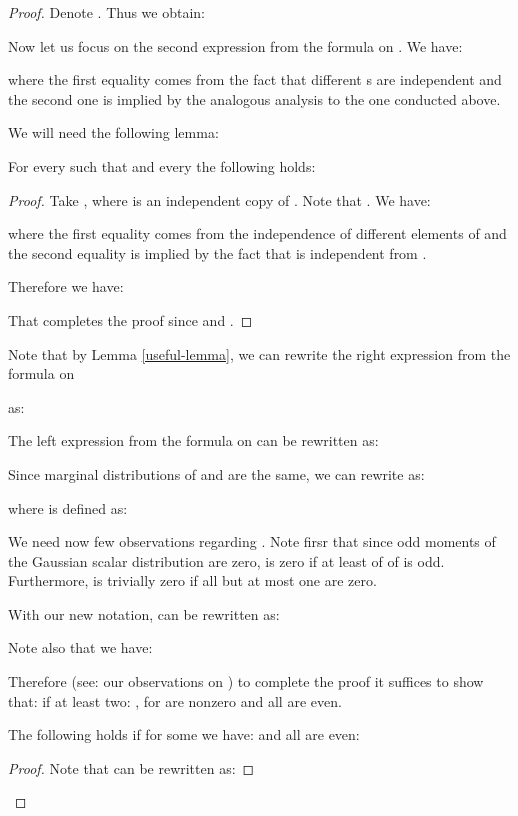 \begin{proof}
Denote .
Thus we obtain:


Now let us focus on the second expression from the formula on . We have:


where the first equality comes from the fact that
different s are independent and the second one is implied by the analogous analysis to the one conducted above.

We will need the following lemma:

\begin{lemma}
\label{useful-lemma}
For every  such that  and every  the following holds:

\end{lemma}

\begin{proof}
Take , where  is an independent copy of . Note that .
We have:

where the first equality comes from the independence of different elements of 
and the second equality is implied by the fact that  is independent from .

Therefore we have:

That completes the proof since  and .
\end{proof}

Note that by Lemma \ref{useful-lemma}, we can rewrite the right expression from the formula on 

as: 

The left expression from the formula on 
 can be rewritten as:


Since marginal distributions of  and  are the same, we can rewrite  as:

where  is defined as:

We need now few observations regarding .
Note firsr that since odd moments of the Gaussian scalar distribution  are zero,  is zero if at least of of  is odd. Furthermore,  is trivially zero if all but at most one  are zero.

With our new notation,  can be rewritten as:


Note also that we have:


Therefore (see: our observations on ) to complete the proof it suffices to show that:  if at least two: ,  for  are nonzero and all  are even.
\begin{lemma}
\label{tau-lemma}
The following holds if for some  we have:  and all  are even:

\end{lemma}
\begin{proof}
Note that  can be rewritten as:


\end{proof}
\end{proof}
